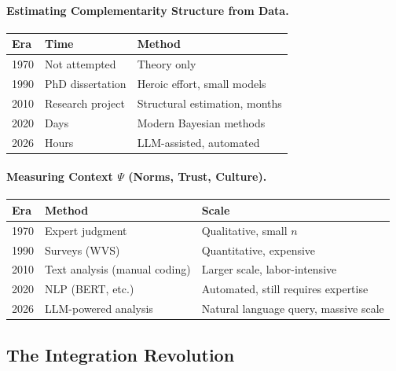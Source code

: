 \paragraph{Estimating Complementarity Structure from Data.}
\begin{center}
\renewcommand{\arraystretch}{1.3}
\begin{tabular}{lll}
\hline
\textbf{Era} & \textbf{Time} & \textbf{Method} \\
\hline
1970 & Not attempted & Theory only \\
1990 & PhD dissertation & Heroic effort, small models \\
2010 & Research project & Structural estimation, months \\
2020 & Days & Modern Bayesian methods \\
2026 & Hours & LLM-assisted, automated \\
\hline
\end{tabular}
\end{center}

\paragraph{Measuring Context $\Psi$ (Norms, Trust, Culture).}
\begin{center}
\renewcommand{\arraystretch}{1.3}
\begin{tabular}{lll}
\hline
\textbf{Era} & \textbf{Method} & \textbf{Scale} \\
\hline
1970 & Expert judgment & Qualitative, small $n$ \\
1990 & Surveys (WVS) & Quantitative, expensive \\
2010 & Text analysis (manual coding) & Larger scale, labor-intensive \\
2020 & NLP (BERT, etc.) & Automated, still requires expertise \\
2026 & LLM-powered analysis & Natural language query, massive scale \\
\hline
\end{tabular}
\end{center}

\subsection{The Integration Revolution}

